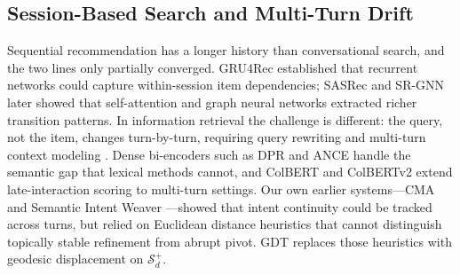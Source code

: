 \documentclass[review]{elsarticle}
\begin{document}
\subsection{Session-Based Search and Multi-Turn Drift}
Sequential recommendation has a longer history than conversational search, and the
two lines only partially converged. GRU4Rec \cite{hidasi2015} established that
recurrent networks could capture within-session item dependencies; SASRec
\cite{kang2018_sasrec} and SR-GNN \cite{wu2019_session} later showed that
self-attention and graph neural networks extracted richer transition patterns. In
information retrieval the challenge is different: the query, not the item, changes
turn-by-turn, requiring query rewriting \cite{vakulenko2021_rewrite} and
multi-turn context modeling \cite{gao2022_convsurvey,iyyer20,zamani20}. Dense
bi-encoders such as DPR \cite{karpukhin2020_dpr} and ANCE \cite{xiong2021_ance}
handle the semantic gap that lexical methods cannot, and ColBERT \cite{khattab20}
and ColBERTv2 \cite{santhanam2022_colbertv2} extend late-interaction scoring to
multi-turn settings. Our own earlier systems---CMA \cite{cma2026,cma2026_clinical}
and Semantic Intent Weaver \cite{papachappa2026_siweaver}---showed that intent
continuity could be tracked across turns, but relied on Euclidean distance
heuristics that cannot distinguish topically stable refinement from abrupt
pivot. GDT replaces those heuristics with geodesic displacement on $\mathcal{S}_d^+$.
\end{document}

